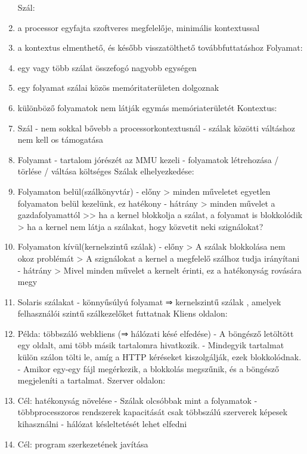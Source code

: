 \documentclass[twoside, a4paper, 12pt]{article}
\begin{document}
\begin{enumerate}
        Szál:
    \item a processor egyfajta szoftveres megfelelője, minimális kontextussal
    \item a kontextus elmenthető, és később visszatölthető továbbfuttatáshoz 
        Folyamat:
    \item egy vagy több szálat összefogó nagyobb egységen
    \item egy folyamat szálai közös memóritaterületen dolgoznak
    \item különböző folyamatok nem látják egymás memóriaterületét
        Kontextus:
    \item Szál
        - nem sokkal bővebb a processorkontextusnál
        - szálak közötti váltáshoz nem kell os támogatása
    \item Folyamat
        - tartalom jórészét az MMU kezeli
        - folyamatok létrehozása / törlése / váltása költséges 
        Szálak elhelyezkedése:
    \item Folyamaton belül(szálkönyvtár)
        - előny
        > minden műveletet egyetlen folyamaton belül kezelünk, ez hatékony
        - hátrány
        > minden művelet a gazdafolyamattól >> ha a kernel blokkolja a szálat, a folyamat is blokkolódik
        > ha a kernel nem látja a szálakat, hogy közvetit neki szignálokat?
    \item Folyamaton kívül(kernelszintű szálak)
        - előny
        > A szálak blokkolása nem okoz problémát
        > A szignálokat a kernel a megfelelő szálhoz tudja irányítani
        - hátrány
        > Mivel minden művelet a kernelt érinti, ez a hatékonyság rovására megy
    \item Solaris szálakat
        - könnyűsúlyú folyamat ⇒ kernelszintű szálak , amelyek felhasználói szintű szálkezelőket futtatnak
        Kliens oldalon:
    \item Példa: többszáló webkliens (⇒ hálózati késé elfedése)
        - A böngésző letöltött egy oldalt, ami több másik tartalomra hivatkozik.
        - Mindegyik tartalmat külön szálon tölti le, amíg a HTTP kéréseket kiszolgálják, ezek blokkolódnak.
        - Amikor egy-egy fájl megérkezik, a blokkolás megszűnik, és a böngésző megjeleníti a tartalmat.
        Szerver oldalon:
    \item Cél: hatékonyság növelése
        - Szálak olcsóbbak mint a folyamatok
        - többprocesszoros rendszerek kapacitását csak többszálú szerverek képesek kihasználni
        - hálózat késleltetését lehet elfedni
    \item Cél: program szerkezetének javítása

\end{enumerate}
\end{document}
